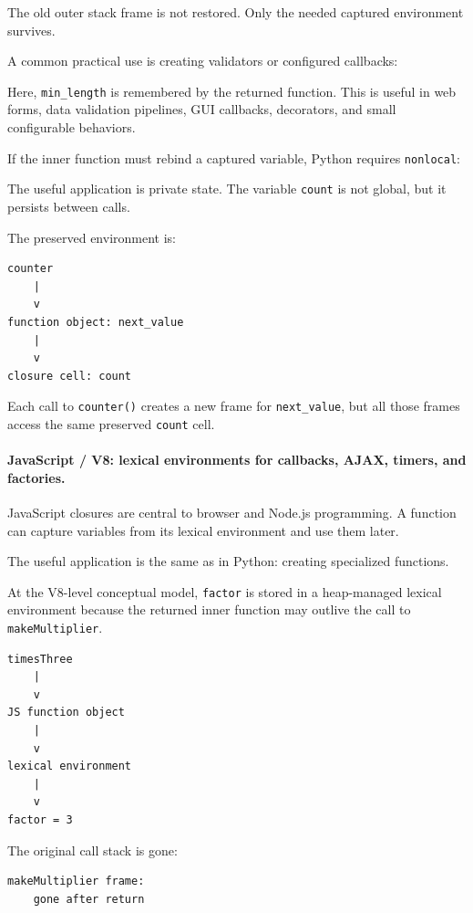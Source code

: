 The old outer stack frame is not restored. Only the needed captured environment survives.

A common practical use is creating validators or configured callbacks:

Here, \texttt{min\_length} is remembered by the returned function. This is useful in web forms, data validation pipelines, GUI callbacks, decorators, and small configurable behaviors.

If the inner function must rebind a captured variable, Python requires \texttt{nonlocal}:

The useful application is private state. The variable \texttt{count} is not global, but it persists between calls.

The preserved environment is:

\begin{verbatim}
counter
    |
    v
function object: next_value
    |
    v
closure cell: count
\end{verbatim}

Each call to \texttt{counter()} creates a new frame for \texttt{next\_value}, but all those frames access the same preserved \texttt{count} cell.

\paragraph{JavaScript / V8: lexical environments for callbacks, AJAX, timers, and factories.}

JavaScript closures are central to browser and Node.js programming. A function can capture variables from its lexical environment and use them later.

The useful application is the same as in Python: creating specialized functions.

At the V8-level conceptual model, \texttt{factor} is stored in a heap-managed lexical environment because the returned inner function may outlive the call to \texttt{makeMultiplier}.

\begin{verbatim}
timesThree
    |
    v
JS function object
    |
    v
lexical environment
    |
    v
factor = 3
\end{verbatim}

The original call stack is gone:

\begin{verbatim}
makeMultiplier frame:
    gone after return
\end{verbatim}

